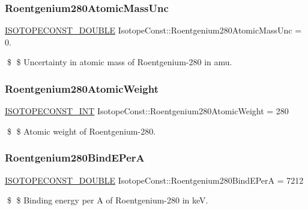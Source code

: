 \subsubsection{\texorpdfstring{Roentgenium280\+Atomic\+Mass\+Unc}{Roentgenium280AtomicMassUnc}}
{\footnotesize\ttfamily \mbox{\hyperlink{group___isotope_const-_macros_ga8f45a7272ce02c0b4c65c44636ed719a}{I\+S\+O\+T\+O\+P\+E\+C\+O\+N\+S\+T\+\_\+\+D\+O\+U\+B\+LE}} Isotope\+Const\+::\+Roentgenium280\+Atomic\+Mass\+Unc = 0.}

\$ \$ Uncertainty in atomic mass of Roentgenium-\/280 in amu. \mbox{\label{group___isotope_const-_roentgenium-_rg280_ga2a25e9a6b086f393ddcba626c3668ba7}} 
\subsubsection{\texorpdfstring{Roentgenium280\+Atomic\+Weight}{Roentgenium280AtomicWeight}}
{\footnotesize\ttfamily \mbox{\hyperlink{group___isotope_const-_macros_ga5f18360b3e99483a35c32d789e62621c}{I\+S\+O\+T\+O\+P\+E\+C\+O\+N\+S\+T\+\_\+\+I\+NT}} Isotope\+Const\+::\+Roentgenium280\+Atomic\+Weight = 280}

\$ \$ Atomic weight of Roentgenium-\/280. \mbox{\label{group___isotope_const-_roentgenium-_rg280_gadbd6ed364ed78dc5329c17e709cf37b4}} 
\subsubsection{\texorpdfstring{Roentgenium280\+Bind\+E\+PerA}{Roentgenium280BindEPerA}}
{\footnotesize\ttfamily \mbox{\hyperlink{group___isotope_const-_macros_ga8f45a7272ce02c0b4c65c44636ed719a}{I\+S\+O\+T\+O\+P\+E\+C\+O\+N\+S\+T\+\_\+\+D\+O\+U\+B\+LE}} Isotope\+Const\+::\+Roentgenium280\+Bind\+E\+PerA = 7212}

\$ \$ Binding energy per A of Roentgenium-\/280 in keV. \mbox{\label{group___isotope_const-_roentgenium-_rg280_gabd369b97d76ec893fc93c70e84e0f089}} 
